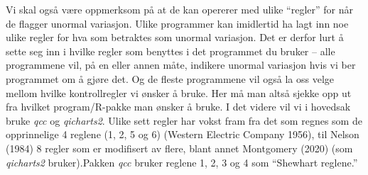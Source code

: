 \documentclass[
]{book}
\begin{document}
Vi skal også være oppmerksom på at de kan opererer med ulike ``regler'' for når de flagger unormal variasjon. Ulike programmer kan imidlertid ha lagt inn noe ulike regler for hva som betraktes som unormal variasjon. Det er derfor lurt å sette seg inn i hvilke regler som benyttes i det programmet du bruker -- alle programmene vil, på en eller annen måte, indikere unormal variasjon hvis vi ber programmet om å gjøre det. Og de fleste programmene vil også la oss velge mellom hvilke kontrollregler vi ønsker å bruke. Her må man altså sjekke opp ut fra hvilket program/R-pakke man ønsker å bruke. I det videre vil vi i hovedsak bruke \emph{qcc} og \emph{qicharts2}. Ulike sett regler har vokst fram fra det som regnes som de opprinnelige 4 reglene (1, 2, 5 og 6) (Western Electric Company 1956), til Nelson (1984) 8 regler som er modifisert av flere, blant annet Montgomery (2020) (som \emph{qicharts2} bruker).Pakken \emph{qcc} bruker reglene 1, 2, 3 og 4 som ``Shewhart reglene.''

\providecommand{\docline}[3]{\noalign{\global\setlength{\arrayrulewidth}{#1}}\arrayrulecolor[HTML]{#2}\cline{#3}}

\setlength{\tabcolsep}{2pt}

\renewcommand*{\arraystretch}{1.5}
\end{document}
